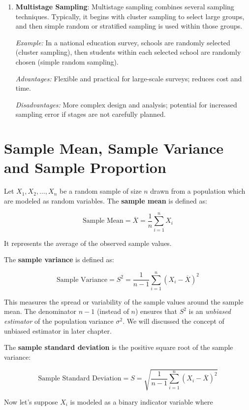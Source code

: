 \documentclass[twoside]{book}
\begin{document}
\begin{enumerate}
\item \textbf{Multistage Sampling}: Multistage sampling combines several sampling techniques. Typically, it begins with cluster sampling to select large groups, and then simple random or stratified sampling is used within those groups.

\textit{Example:} In a national education survey, schools are randomly selected (cluster sampling), then students within each selected school are randomly chosen (simple random sampling).

\textit{Advantages:} Flexible and practical for large-scale surveys; reduces cost and time.  

\textit{Disadvantages:} More complex design and analysis; potential for increased sampling error if stages are not carefully planned.
\end{enumerate}

\section{Sample Mean, Sample Variance and Sample Proportion}

Let \( X_1, X_2, \dots, X_n \) be a random sample of size \( n \) drawn from a population which are modeled as random variables. The \textbf{sample mean} is defined as:
\begin{textbox}
     \[
\text{Sample Mean} = \overline{X} = \frac{1}{n} \sum_{i=1}^{n} X_i
\]
\end{textbox}
It represents the average of the observed sample values.

The \textbf{sample variance} is defined as:
\begin{textbox}
\[
\text{Sample Variance} = S^2 = \frac{1}{n - 1} \sum_{i=1}^{n} (X_i - \overline{X})^2
\]
\end{textbox}
This measures the spread or variability of the sample values around the sample mean. The denominator \( n - 1 \) (instead of \( n \)) ensures that \( S^2 \) is an \emph{unbiased estimator} of the population variance \( \sigma^2 \). We will discussed the concept of unbiased estimator in later chapter.

The \textbf{sample standard deviation} is the positive square root of the sample variance:
\begin{textbox}
\[
\text{Sample Standard Deviation} = S = \sqrt{\frac{1}{n - 1} \sum_{i=1}^{n} (X_i - \overline{X})^2}
\]
\end{textbox}

Now let's suppose \( X_i \) is modeled as a binary indicator variable where
\end{document}
